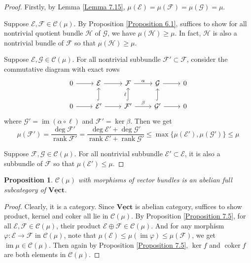 \documentclass{ctexart}
\newtheorem{proposition}{Proposition}[section]
\newcommand{\rank}{\operatorname{rank}}
\newcommand{\im}{\operatorname{im}}
\newcommand{\coker}{\operatorname{coker}}
\newcommand{\vectorbundle}{\underline{\mathbf{Vect}}}
\begin{document}
\begin{proof}
    Firstly, by Lemma \ref{Lemma 7.15}, $\mu(\mathcal{E}) = \mu(\mathcal{F}) = \mu(\mathcal{G}) = \mu$.
    \par
    Suppose $\mathcal{E}, \mathcal{F}\in \mathscr{C}(\mu)$.
    By Proposition \ref{Proposition 6.1}, suffices to show for all nontrivial quotient bundle $\mathcal{H}$ of $\mathcal{G}$, we have $\mu(\mathcal{H}) \ge \mu$.
    In fact, $\mathcal{H}$ is also a nontrivial bundle of $\mathcal{F}$ so that $\mu(\mathcal{H}) \ge \mu$.
    \par
    Suppose $\mathcal{E}, \mathcal{G}\in \mathscr{C}(\mu)$.
    For all nontrivial subbundle $\mathcal{F}' \subset \mathcal{F}$, consider the commutative diagram with exact rows
    \begin{equation}
        \begin{tikzcd}
            0 \arrow[r] &
            \mathcal{E} \arrow[r] &
            \mathcal{F} \arrow[r, "\alpha"] &
            \mathcal{G} \arrow[r] &
            0 \\
            0 \arrow[r] &
            \mathcal{E}' \arrow[u, hookrightarrow] \arrow[r] &
            \mathcal{F}' \arrow[u, hookrightarrow, "\ell"] \arrow[r, "\beta"] &
            \mathcal{G}' \arrow[u, hookrightarrow] \arrow[r] &
            0
        \end{tikzcd}
    \end{equation}
    where $\mathcal{G}' = \im (\alpha \circ \ell)$ and $\mathcal{F}' = \ker \beta$.
    Then we get
    \begin{equation}
        \mu(\mathcal{F}') = \frac{\deg \mathcal{F}'}{\rank \mathcal{F}'} = \frac{\deg \mathcal{E}' + \deg \mathcal{G}'}{\rank \mathcal{E}' + \rank \mathcal{G}'} \le \max \{\mu(\mathcal{E}'), \mu(\mathcal{G}')\} \le \mu
    \end{equation}
    \par
    Suppose $\mathcal{F}, \mathcal{G}\in \mathscr{C}(\mu)$.
    For all nontrivial subbundle $\mathcal{E}' \subset \mathcal{E}$, it is also a subbundle of $\mathcal{F}$ so that $\mu(\mathcal{E}') \le \mu$.
\end{proof}
\begin{proposition}
    $\mathscr{C}(\mu)$ with morphisms of vector bundles is an abelian full subcategory of $\vectorbundle$.
    \label{Proposition 7.6}
\end{proposition}
\begin{proof}
    Clearly, it is a category.
    Since $\vectorbundle$ is abelian category, suffices to show product, kernel and coker all lie in $\mathscr{C}(\mu)$.
    By Proposition \ref{Proposition 7.5}, for all $\mathcal{E}, \mathcal{F}\in \mathscr{C}(\mu)$, their product $\mathcal{E} \oplus \mathcal{F}\in \mathscr{C}(\mu)$.
    And for any morphism $\varphi: \mathcal{E} \rightarrow \mathcal{F}$ in $\mathscr{C}(\mu)$,
    note that $\mu(\mathcal{E}) \le \mu(\im \varphi) \le \mu(\mathcal{F})$, we get $\im \mu\in \mathscr{C}(\mu)$.
    Then again by Proposition \ref{Proposition 7.5}, $\ker f$ and $\coker f$ are both elements in $\mathscr{C}(\mu)$.
\end{proof}
\end{document}
